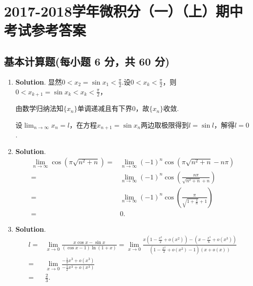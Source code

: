 \documentclass[../Main.tex]{subfiles}
\begin{document}
\chapter{2017-2018学年微积分（一）（上）期中考试参考答案}
\section{基本计算题(每小题 6 分，共 60 分)}
\begin{enumerate}
    \item \textbf{Solution}. 显然$0<x_{2}=\sin x_{1}<\frac{\pi}{2}$.设$0<x_{k}<\frac{\pi}{2}$，则$0
              <x_{k+1}=\sin x_{k}<x_{k}<\frac{\pi}{2}$，

          由数学归纳法知$\{x_{n}\}$单调递减且有下界0，故$\{x_{n}\}$收敛.

          设$\lim_{n\to\infty}x_{n}=l$，在方程$x_{n+1}=\sin x_{n}$两边取极限得到$l=\sin
              l$，解得$l=0$.

    \item \textbf{Solution}.
          \[
              \begin{aligned}
                  \lim_{n\to\infty}\cos\left(\pi\sqrt{n^2+n}\right)= & \lim_{n\to\infty}(-1)^{n}\cos\left(\pi\sqrt{n^2+n}-n\pi\right)               \\
                  =                                                  & \lim_{n\to\infty}(-1)^{n}\cos\left(\frac{n\pi}{\sqrt{n^2+n}+n}\right)        \\
                  =                                                  & \lim_{n\to\infty}(-1)^{n}\cos\left(\frac{\pi}{\sqrt{1+\frac{1}{n}}+1}\right) \\
                  =                                                  & 0.
              \end{aligned}
          \]

    \item \textbf{Solution}.
          \[
              \begin{aligned}
                  l= & \lim_{x\to0}\frac{x\cos x-\sin x}{(\cos x-1)\ln(1+x)}= \lim_{x\to0}\frac{x\left(1-\frac{x^2}{2}+o(x^2)\right)-\left(x-\frac{x^3}{6}+o(x^3)\right)}{\left(1-\frac{x^2}{2}+o(x^2)-1\right)\left(x+o(x)\right)} \\
                  =  & \lim_{x\to0}\frac{-\frac{1}{3}x^3+o(x^3)}{-\frac{1}{2}x^3+o(x^3)}                                                                                                                                            \\
                  =  & \frac{2}{3}.
              \end{aligned}
          \]


\end{enumerate}
\end{document}
